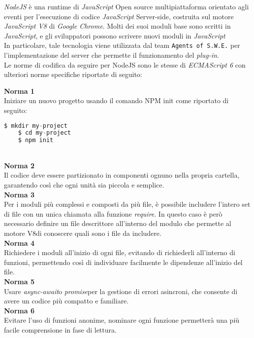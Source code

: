\textit{NodeJS} è una runtime di \textit{JavaScript} Open source multipiattaforma orientato agli eventi per l'esecuzione di codice \textit{JavaScript} Server-side, costruita sul motore \textit{JavaScript V8} di \textit{Google Chrome}. Molti dei suoi moduli base sono scritti in \textit{JavaScript}, e gli sviluppatori possono scrivere nuovi moduli in \textit{JavaScript}\\
In particolare, tale tecnologia viene utilizzata dal team \texttt{Agents of S.W.E.} per l'implementazione del server che permette il funzionamento del \textit{plug-in}. \\
Le norme di codifica da seguire per NodeJS sono le stesse di \textit{ECMAScript 6} con ulteriori norme specifiche riportate di seguito:

\textbf{Norma 1} \\
Iniziare un nuovo progetto usando il comando NPM init come riportato di seguito:
\begin{lstlisting}[language=JavaScript]
	$ mkdir my-project
	$ cd my-project
	$ npm init
\end{lstlisting}

\-\\

\textbf{Norma 2} \\
Il codice deve essere partizionato in componenti ognuno nella propria cartella, garantendo così che ogni unità sia piccola e semplice. 
\-\\

\textbf{Norma 3} \\
Per i moduli più complessi e composti da più file, è possibile includere l’intero set di file con un unica chiamata alla funzione \textit{require}\glossario. In questo caso è però necessario definire un file descrittore all’interno del modulo che permette al motore V8\glossario di conoscere quali sono i file da includere.
\-\\

\textbf{Norma 4} \\
Richiedere i moduli all'inizio di ogni file, evitando di richiederli all'interno di funzioni, permettendo così di individuare facilmente le dipendenze all'inizio del file.
\-\\

\textbf{Norma 5} \\
Usare \textit{async-await}\glossario o \textit{promise}\glossario per la gestione di errori asincroni, che consente di avere un codice più compatto e familiare.
\-\\

\textbf{Norma 6} \\
Evitare l'uso di funzioni anonime, nominare ogni funzione permetterà una più facile comprensione in fase di lettura.
\-\\

  



